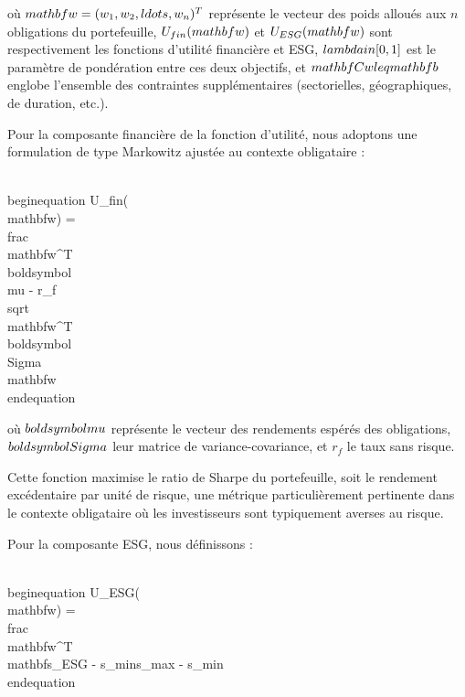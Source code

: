 où $\\mathbf{w} = (w_1, w_2, \\ldots, w_n)^T$ représente le vecteur des poids alloués aux $n$ obligations du portefeuille, $U_{fin}(\\mathbf{w})$ et $U_{ESG}(\\mathbf{w})$ sont respectivement les fonctions d'utilité financière et ESG, $\\lambda \\in [0,1]$ est le paramètre de pondération entre ces deux objectifs, et $\\mathbf{C w} \\leq \\mathbf{b}$ englobe l'ensemble des contraintes supplémentaires (sectorielles, géographiques, de duration, etc.).

Pour la composante financière de la fonction d'utilité, nous adoptons une formulation de type Markowitz ajustée au contexte obligataire :

\\begin{equation}
U_{fin}(\\mathbf{w}) = \\frac{\\mathbf{w}^T \\boldsymbol{\\mu} - r_f}{\\sqrt{\\mathbf{w}^T \\boldsymbol{\\Sigma} \\mathbf{w}}}
\\end{equation}

où $\\boldsymbol{\\mu}$ représente le vecteur des rendements espérés des obligations, $\\boldsymbol{\\Sigma}$ leur matrice de variance-covariance, et $r_f$ le taux sans risque.

Cette fonction maximise le ratio de Sharpe du portefeuille, soit le rendement excédentaire par unité de risque, une métrique particulièrement pertinente dans le contexte obligataire où les investisseurs sont typiquement averses au risque.

Pour la composante ESG, nous définissons :

\\begin{equation}
U_{ESG}(\\mathbf{w}) = \\frac{\\mathbf{w}^T \\mathbf{s}_{ESG} - s_{min}}{s_{max} - s_{min}}
\\end{equation}

